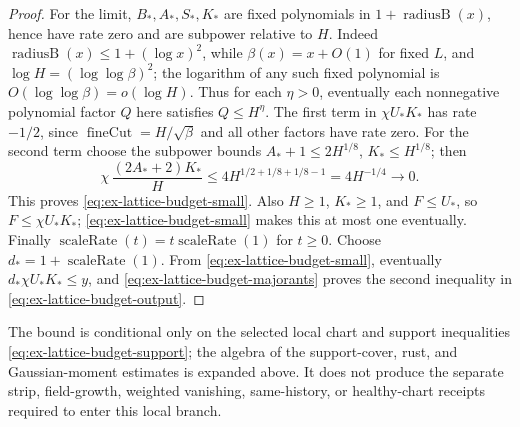 \begin{proof}
For the limit, \(B_*,A_*,S_*,K_*\) are fixed polynomials in
\(1+\operatorname{radiusB}(x)\), hence have rate zero and are subpower
relative to \(H\). Indeed \(\operatorname{radiusB}(x)\le
1+(\log x)^2\), while \(\beta(x)=x+O(1)\) for fixed \(L\), and
\(\log H=(\log\log\beta)^2\); the logarithm of any such fixed
polynomial is \(O(\log\log\beta)=o(\log H)\). Thus for each \(\eta>0\),
eventually each nonnegative polynomial factor \(Q\) here satisfies
\(Q\le H^\eta\). The first term in \(\chi U_*K_*\) has rate
\(-1/2\), since \(\operatorname{fineCut}=H/\sqrt{\beta}\) and all other
factors have rate zero. For the second term choose the subpower bounds
\(A_*+1\le2H^{1/8}\), \(K_*\le H^{1/8}\); then
\[
 \chi\,\frac{(2A_*+2)K_*}{H}
 \le4H^{1/2+1/8+1/8-1}=4H^{-1/4}\longrightarrow0.
\]
This proves \eqref{eq:ex-lattice-budget-small}. Also \(H\ge1\), \(K_*\ge1\), and \(F\le U_*\), so
\(F\le\chi U_*K_*\); \eqref{eq:ex-lattice-budget-small} makes this at most one eventually. Finally
\(\operatorname{scaleRate}(t)=t\operatorname{scaleRate}(1)\) for \(t\ge0\).
Choose \(d_*=1+\operatorname{scaleRate}(1)\). From \eqref{eq:ex-lattice-budget-small}, eventually
\(d_*\chi U_*K_*\le y\), and \eqref{eq:ex-lattice-budget-majorants} proves the second inequality in \eqref{eq:ex-lattice-budget-output}.
\end{proof}

The bound is conditional only on the selected local chart and support
inequalities \eqref{eq:ex-lattice-budget-support}; the algebra of the support-cover, rust, and
Gaussian-moment estimates is expanded above. It does not produce the separate strip, field-growth, weighted
vanishing, same-history, or healthy-chart receipts required to enter this
local branch.
